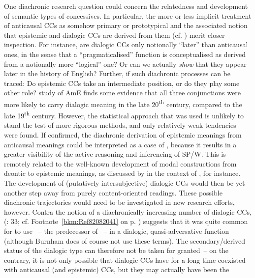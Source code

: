 One diachronic research question could concern the relatedness and development of semantic types of concessives. In particular, the more or less implicit treatment of anticausal CCs as somehow primary or prototypical and the associated notion that epistemic and dialogic CCs are derived from them (cf. \citealt{Hilpert2013a,Sweetser1990}) merit closer inspection. For instance, are dialogic CCs only notionally “later” than anticausal ones, in the sense that a “pragmaticalised” function is conceptualised as derived from a notionally more “logical” one? Or can we actually \textit{show} that they appear later in the history of English? Further, if such diachronic processes can be traced: Do epistemic CCs take an intermediate position, or do they play some other role?  study of AmE finds some evidence that all three conjunctions were more likely to carry dialogic meaning in the late 20\textsuperscript{th} century, compared to the late 19\textsuperscript{th} century. However, the statistical approach that was used is unlikely to stand the test of more rigorous methods, and only relatively weak tendencies were found. If confirmed, the diachronic derivation of epistemic meanings from anticausal meanings could be interpreted as a case of , because it results in a greater visibility of the active reasoning and inferencing of SP/W. This is remotely related to the well-known development of modal constructions from deontic to epistemic meanings, as discussed by \citet[91]{Krug2000} in the context of , for instance. The development of (putatively intersubjective) dialogic CCs would then be yet another step away from purely content-oriented readings. These possible diachronic trajectories would need to be investigated in new research efforts, however. Contra the notion of a diachronically increasing number of dialogic CCs, \citeauthor{Burnham1911} (\citeyear{Burnham1911}: 33; cf. Footnote~\ref{bkm:Ref82082041} on p. \pageref{bkm:Ref82082041}) suggests that it was quite common for  to use ~– the predecessor of ~– in a dialogic, quasi-adversative function (although Burnham does of course not use these terms). The secondary/derived status of the dialogic type can therefore not be taken for granted~– on the contrary, it is not only possible that dialogic CCs have for a long time coexisted with anticausal (and epistemic) CCs, but they may actually have been the 